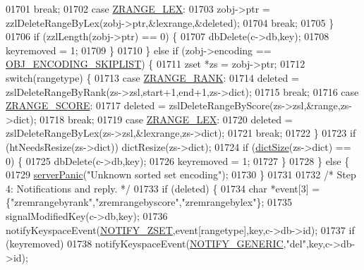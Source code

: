 \begin{DoxyCode}
01701             \textcolor{keywordflow}{break};
01702         \textcolor{keywordflow}{case} \hyperlink{t__zset_8c_a74c64b6c3895c27dc16c15a3c4c590af}{ZRANGE\_LEX}:
01703             zobj->ptr = zzlDeleteRangeByLex(zobj->ptr,&lexrange,&deleted);
01704             \textcolor{keywordflow}{break};
01705         \}
01706         \textcolor{keywordflow}{if} (zzlLength(zobj->ptr) == 0) \{
01707             dbDelete(c->db,key);
01708             keyremoved = 1;
01709         \}
01710     \} \textcolor{keywordflow}{else} \textcolor{keywordflow}{if} (zobj->encoding == \hyperlink{server_8h_acfb35db5cb30ed113ed23aeb1a224c4c}{OBJ\_ENCODING\_SKIPLIST}) \{
01711         zset *zs = zobj->ptr;
01712         \textcolor{keywordflow}{switch}(rangetype) \{
01713         \textcolor{keywordflow}{case} \hyperlink{t__zset_8c_a5efcb596b1e5f49647431b38c2c5dde3}{ZRANGE\_RANK}:
01714             deleted = zslDeleteRangeByRank(zs->zsl,start+1,end+1,zs->dict);
01715             \textcolor{keywordflow}{break};
01716         \textcolor{keywordflow}{case} \hyperlink{t__zset_8c_a0ca38ddc10a38a3b5f6b50e2b25fc4ce}{ZRANGE\_SCORE}:
01717             deleted = zslDeleteRangeByScore(zs->zsl,&range,zs->dict);
01718             \textcolor{keywordflow}{break};
01719         \textcolor{keywordflow}{case} \hyperlink{t__zset_8c_a74c64b6c3895c27dc16c15a3c4c590af}{ZRANGE\_LEX}:
01720             deleted = zslDeleteRangeByLex(zs->zsl,&lexrange,zs->dict);
01721             \textcolor{keywordflow}{break};
01722         \}
01723         \textcolor{keywordflow}{if} (htNeedsResize(zs->dict)) dictResize(zs->dict);
01724         \textcolor{keywordflow}{if} (\hyperlink{dict_8h_af193430dd3d5579a52b194512f72c1f0}{dictSize}(zs->dict) == 0) \{
01725             dbDelete(c->db,key);
01726             keyremoved = 1;
01727         \}
01728     \} \textcolor{keywordflow}{else} \{
01729         \hyperlink{server_8h_a11cc378e7778a830b41240578de3b204}{serverPanic}(\textcolor{stringliteral}{"Unknown sorted set encoding"});
01730     \}
01731 
01732     \textcolor{comment}{/* Step 4: Notifications and reply. */}
01733     \textcolor{keywordflow}{if} (deleted) \{
01734         \textcolor{keywordtype}{char} *event[3] = \{\textcolor{stringliteral}{"zremrangebyrank"},\textcolor{stringliteral}{"zremrangebyscore"},\textcolor{stringliteral}{"zremrangebylex"}\};
01735         signalModifiedKey(c->db,key);
01736         notifyKeyspaceEvent(\hyperlink{server_8h_ab8516a5a3ff1b9eb5f1cb303abef0d2f}{NOTIFY\_ZSET},event[rangetype],key,c->db->id);
01737         \textcolor{keywordflow}{if} (keyremoved)
01738             notifyKeyspaceEvent(\hyperlink{server_8h_a9fa53dd1068e62365f3964ad3479eec2}{NOTIFY\_GENERIC},\textcolor{stringliteral}{"del"},key,c->db->id);

\end{DoxyCode}
